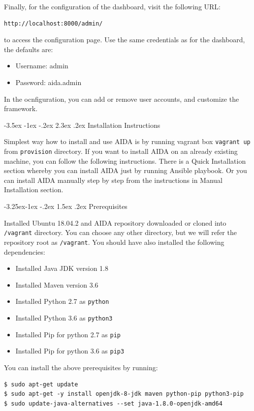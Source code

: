 \documentclass[a4paper]{article} %
\makeatletter
\renewcommand\section{\@startsection {section}{1}{\z@}%
                   {-3.5ex \@plus -1ex \@minus -.2ex}%
                   {2.3ex \@plus.2ex}%
                   {\normalfont\sffamily\Large\bfseries\color{projectcolor}}}
\renewcommand\subsection{\@startsection{subsection}{2}{\z@}%
                   {-3.25ex\@plus -1ex \@minus -.2ex}%
                   {1.5ex \@plus .2ex}%
                   {\normalfont\sffamily\large\bfseries\color{projectcolor}}}
\makeatother
\begin{document}
Finally, for the configuration of the dashboard, visit the following URL:

\begin{lstlisting}[]
http://localhost:8000/admin/
\end{lstlisting}

to access the configuration page. Use the same credentials as for the dashboard, the defaults are:
\begin{itemize}[noitemsep,nolistsep]
  \item[] Username: admin
  \item[] Password: aida.admin
\end{itemize}
In the ocnfiguration, you can add or remove user accounts, and customize the framework.

\cleardoublepage

\section{Installation Instructions}

Simplest way how to install and use AIDA is by running vagrant box \texttt{vagrant up} from \texttt{provision} directory. If you want to install AIDA on an already existing machine, you can follow the following instructions. There is a Quick Installation section whereby you can install AIDA just by running Ansible playbook. Or you can install AIDA manually step by step from the instructions in Manual Installation section.

\subsection{Prerequisites}

Installed Ubuntu 18.04.2 and AIDA repository downloaded or cloned into \texttt{/vagrant} directory. You can choose any other directory, but we will refer the repository root as \texttt{/vagrant}. You should have also installed the following dependencies:
\begin{itemize}[nolistsep,noitemsep]
    \item Installed Java JDK version 1.8
    \item Installed Maven version 3.6
    \item Installed Python 2.7 as \texttt{python}
    \item Installed Python 3.6 as \texttt{python3}
    \item Installed Pip for python 2.7 as \texttt{pip}
    \item Installed Pip for python 3.6 as \texttt{pip3}
\end{itemize}
You can install the above prerequisites by running:
\begin{lstlisting}
$ sudo apt-get update
$ sudo apt-get -y install openjdk-8-jdk maven python-pip python3-pip
$ sudo update-java-alternatives --set java-1.8.0-openjdk-amd64
\end{lstlisting}
\end{document}
